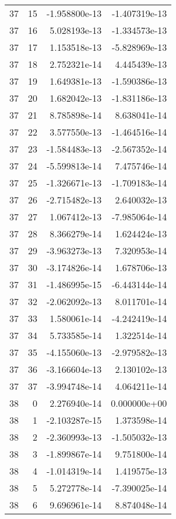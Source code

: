 \begin{tabular}{rrrr}
  37 &   15 & -1.958800e-13 & -1.407319e-13 \\
  37 &   16 &  5.028193e-13 & -1.334573e-13 \\
  37 &   17 &  1.153518e-13 & -5.828969e-13 \\
  37 &   18 &  2.752321e-14 &  4.445439e-13 \\
  37 &   19 &  1.649381e-13 & -1.590386e-13 \\
  37 &   20 &  1.682042e-13 & -1.831186e-13 \\
  37 &   21 &  8.785898e-14 &  8.638041e-14 \\
  37 &   22 &  3.577550e-13 & -1.464516e-14 \\
  37 &   23 & -1.584483e-13 & -2.567352e-14 \\
  37 &   24 & -5.599813e-14 &  7.475746e-14 \\
  37 &   25 & -1.326671e-13 & -1.709183e-14 \\
  37 &   26 & -2.715482e-13 &  2.640032e-13 \\
  37 &   27 &  1.067412e-13 & -7.985064e-14 \\
  37 &   28 &  8.366279e-14 &  1.624424e-13 \\
  37 &   29 & -3.963273e-13 &  7.320953e-14 \\
  37 &   30 & -3.174826e-14 &  1.678706e-13 \\
  37 &   31 & -1.486995e-15 & -6.443144e-14 \\
  37 &   32 & -2.062092e-13 &  8.011701e-14 \\
  37 &   33 &  1.580061e-14 & -4.242419e-14 \\
  37 &   34 &  5.733585e-14 &  1.322514e-14 \\
  37 &   35 & -4.155060e-13 & -2.979582e-13 \\
  37 &   36 & -3.166604e-13 &  2.130102e-13 \\
  37 &   37 & -3.994748e-14 &  4.064211e-14 \\
  38 &    0 &  2.276940e-14 &  0.000000e+00 \\
  38 &    1 & -2.103287e-15 &  1.373598e-14 \\
  38 &    2 & -2.360993e-13 & -1.505032e-13 \\
  38 &    3 & -1.899867e-14 &  9.751800e-14 \\
  38 &    4 & -1.014319e-14 &  1.419575e-13 \\
  38 &    5 &  5.272778e-14 & -7.390025e-14 \\
  38 &    6 &  9.696961e-14 &  8.874048e-14 \\

\end{tabular}
